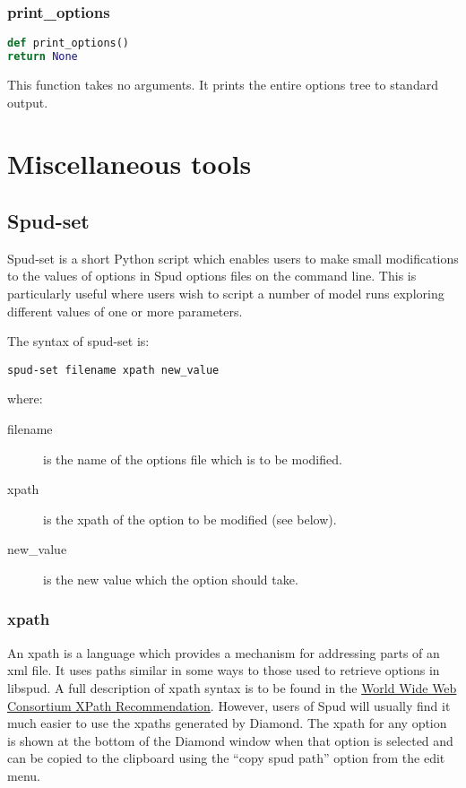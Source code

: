 \documentclass[a4paper, 11pt]{book}
\begin{document}
\subsection{print\_options}

\begin{lstlisting}[language=Python]
def print_options()
return None
\end{lstlisting}

This function takes no arguments.
It prints the entire options tree to standard output.




\chapter{Miscellaneous tools}

\section{Spud-set}

Spud-set is a short Python script which enables users to make small
modifications to the values of options in Spud options files on the command
line. This is particularly useful where users wish to script a number of
model runs exploring different values of one or more parameters.

The syntax of spud-set is:
\begin{verbatim}
spud-set filename xpath new_value
\end{verbatim}
where:
\begin{description}
\item[filename] is the name of the options file which is to be modified.
\item[xpath] is the xpath of the option to be modified (see below).
\item[new\_value] is the new value which the option should take.
\end{description}

\subsection{xpath}

An xpath is a language which provides a mechanism for addressing parts of an
xml file. It uses paths similar in some ways to those used to retrieve
options in libspud. A full description of xpath syntax is to be found in the
\href{http://www.w3.org/TR/xpath}{World Wide Web Consortium XPath
  Recommendation}. However, users of Spud will usually find it much easier
to use the xpaths generated by Diamond. The xpath for any option is shown at
the bottom of the Diamond window when that option is selected and can be
copied to the clipboard using the ``copy spud path'' option from the edit menu.
\end{document}
